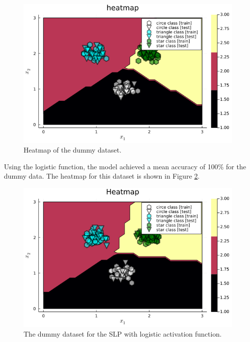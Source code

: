 \documentclass[12pt,a4paper]{article}
\begin{document}
\begin{figure}[H]
    \centering
    \includegraphics[scale=0.5]{../trab3 (single layer perceptron)/figs/dummy data - heatmap.png}
    \caption{Heatmap of the dummy dataset.}
    \label{fig:heatmap-dummy-dataset}
\end{figure}

Using the logistic function, the model achieved a mean accuracy of 100\% for the dummy data. The heatmap for this dataset is shown in Figure \ref{fig:dummy-data-heatmap}.


\begin{figure}[H]
    \centering
    \includegraphics[scale=0.4]{../trab4 (single layer perceptron with sigmoidal functions)/figs/dummy data - heatmap.png}%
    
    \caption{The dummy dataset for the SLP with logistic activation function.}
    \label{fig:dummy-data-heatmap}
\end{figure}
\end{document}
